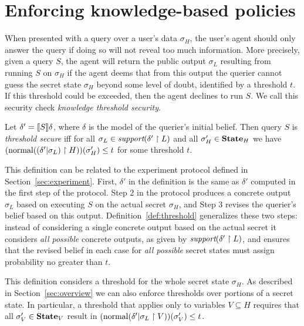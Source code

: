 \section{Enforcing knowledge-based policies}
\label{sec:policy}

When presented with a query over a user's data $\sigma_H$, the user's
agent should only answer the query if doing so will not reveal too
much information.  More precisely, given a query $S$, the agent will
return the public output $\sigma_L$ resulting from running $S$ on
$\sigma_H$ if the agent deems that from this output the querier cannot
guess the secret state $\sigma_H$ beyond some level of doubt,
identified by a threshold $ t $.  If this threshold could be exceeded,
then the agent declines to run $S$.  We call this security
check \emph{knowledge threshold security}.

\begin{definition}
\label{def:threshold}
Let $\delta' = [\![{S}]\!]{\delta}$, where $\delta$ is the model of the
querier's initial belief.  Then query $S$ is \emph{threshold
secure} iff for all $\sigma_L \in \textit{support}(\delta' \upharpoonright L)$ and
all $ \sigma'_H \in \textbf{State}_H$ we have
$(\text{normal}(\left( \delta' | \sigma_L \right) \upharpoonright H))(\sigma'_H) \leq t$
for some threshold $t$.
\end{definition}

This definition can be related to the experiment protocol defined in
Section~\ref{sec:experiment}.  First, $\delta'$ in the definition is
the same as $\delta'$ computed in the first step of the protocol.
Step 2 in the protocol produces a concrete output $\hat{\sigma}_L$
based on executing $S$ on the actual secret $\sigma_H$, and Step 3
revises the querier's belief based on this output.
Definition~\ref{def:threshold} generalizes these two steps: instead of
considering a single concrete output based on the actual secret it
considers \emph{all possible} concrete outputs, as given by
$\textit{support}(\delta' \upharpoonright L)$, and ensures that the revised belief in
each case for \emph{all possible} secret states must assign
probability no greater than $t$.

This definition considers a threshold for the whole secret state
$\sigma_H$.  As described in Section~\ref{sec:overview} we can also
enforce thresholds over portions of a secret state.  In particular, a
threshold that applies only to variables $V \subseteq H$ requires that
all $ \sigma'_V \in \textbf{State}_V$ result in
$(\text{normal}(\delta' | \sigma_L \upharpoonright V))(\sigma'_V) \leq t$.

